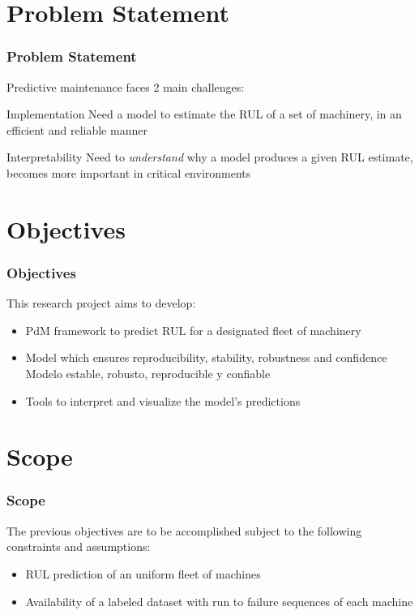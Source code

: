 \documentclass{beamer}
\begin{document}
    \section{Problem Statement}

        \begin{frame}
            \frametitle{Problem Statement}

            Predictive maintenance faces 2 main challenges:
            \begin{block}{Implementation}
                Need a model to estimate the RUL of a set of machinery, in an efficient and reliable manner
            \end{block}

            \begin{alertblock}{Interpretability}
                Need to \textit{understand} why a model produces a given RUL estimate, becomes more important in critical environments
            \end{alertblock}

        \end{frame}

    \section{Objectives}

        \begin{frame}
            \frametitle{Objectives}
            This research project aims to develop:
            \begin{itemize}
                \item PdM framework to predict RUL for a designated fleet of machinery
                \item Model which ensures reproducibility, stability, robustness and confidence Modelo estable, robusto, reproducible y confiable
                \item Tools to interpret and visualize the model's predictions
            \end{itemize}
        \end{frame}

    \section{Scope}

        \begin{frame}
            \frametitle{Scope}
            The previous objectives are to be accomplished subject to the following constraints and assumptions:
            \begin{itemize}
                \item RUL prediction of an uniform fleet of machines
                \item Availability of a labeled dataset with run to failure sequences of each machine
            \end{itemize}
        \end{frame}
\end{document}
